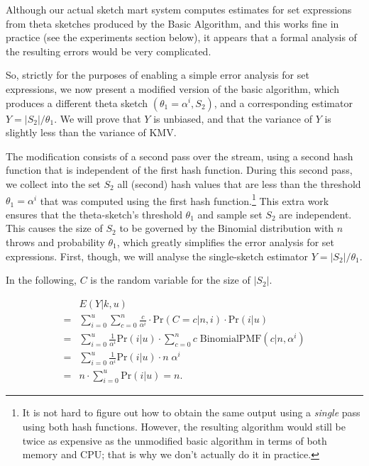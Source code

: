 \documentclass{sig-alternate}
\begin{document}
Although our actual sketch mart system computes estimates for set expressions
from theta sketches produced by the Basic Algorithm, and this works
fine in practice (see the experiments section below), it appears
that a formal analysis of the resulting errors would be very complicated.

So, strictly for the purposes of enabling a simple error analysis for
set expressions, we now present a modified version of the basic
algorithm, which produces a different theta sketch $(\theta_1 = \alpha^i,
S_2)$, and a corresponding estimator $Y = |S_2| / \theta_1$. We will
prove that $Y$ is unbiased, and that the variance of $Y$ is slightly
less than the variance of KMV.

The modification consists of a second pass over the stream, using a
second hash function that is independent of the first hash function.
During this second pass, we collect into the set $S_2$ all (second) hash
values that are less than the threshold $\theta_1 = \alpha^i$ that was computed
using the first hash function.\footnote{It is not hard to figure out how to obtain the same
output using a {\em single} pass using both hash functions. However, the
resulting algorithm would still be twice as expensive as the
unmodified basic algorithm in terms of both memory and CPU; that is
why we don't actually do it in practice.} This extra work ensures that
the theta-sketch's threshold $\theta_1$ and sample set $S_2$ are independent.
This causes the size of $S_2$ to be governed by the Binomial distribution
with $n$ throws and probability $\theta_1$, which greatly simplifies the
error analysis for set expressions. First, though, we will analyse the single-sketch
estimator $Y = |S_2| / \theta_1$.

In the following, $C$ is the random variable for the size of $|S_2|$.

\begin{align}
 & E(Y|k,u)  \\
= &    \sum_{i=0}^u    \sum_{c=0}^{n}    \frac{c}{\alpha^i}   \cdot \mathrm{Pr}(C = c|n,i)   \cdot \mathrm{Pr}(i|u) \\
= &    \sum_{i=0}^u  \frac{1}{\alpha^i}  \mathrm{Pr}(i|u)  \cdot \sum_{c=0}^{n} c \; \mathrm{BinomialPMF}(c|n,\alpha^i) \\     %
= &    \sum_{i=0}^u  \frac{1}{\alpha^i}  \mathrm{Pr}(i|u)  \cdot n \; \alpha^i \\
= & n \cdot \sum_{i=0}^u \mathrm{Pr}(i|u) = n.
\end{align}
\end{document}
